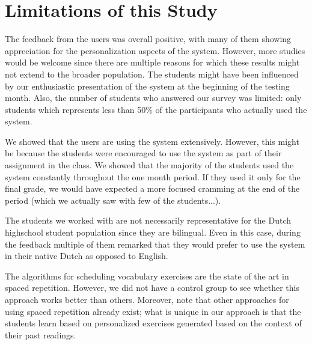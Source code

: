 
\section{Limitations of this Study}
\label{sec:limitations}

The feedback from the users was overall positive, with many of them showing appreciation for the personalization aspects of the system. However, more studies would be welcome since there are multiple reasons for which these results might not extend to the broader population. The students might have been influenced by our enthusiastic presentation of the system at the beginning of the testing month. Also, the number of students who answered our survey was limited: only \surveyrespondents students which represents less than 50\% of the participants who actually used the system.

We showed that the users are using the system extensively. However, this might be because the students were encouraged to use the system as part of their assignment in the class. We showed that the majority of the students used the system constantly throughout the one month period. If they used it only for the final grade, we would have expected a more focused cramming at the end of the period (which we actually saw with few of the students...). 

The students we worked with are not necessarily representative for the Dutch highschool student population since they are bilingual. Even in this case, during the feedback multiple of them remarked that they would prefer to use the system in their native Dutch as opposed to English.


The algorithms for scheduling vocabulary exercises are the state of the art in spaced repetition. However, we did not have a control group to see whether this approach works better than others. Moreover, note that other approaches for using spaced repetition already exist; what is unique in our approach is that the students learn based on personalized exercises generated based on the context of their past readings.




